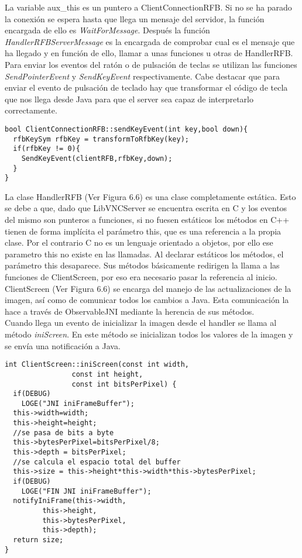 La variable aux\_this es un puntero a ClientConnectionRFB. Si no se ha parado la conexión se espera hasta que llega un mensaje del servidor, la función encargada de ello es \emph{WaitForMessage}. Después la función \emph{HandlerRFBServerMessage} es la encargada de comprobar cual es el mensaje que ha llegado y en función de ello, llamar a unas funciones u otras de HandlerRFB.\\

Para enviar los eventos del ratón o de pulsación de teclas se utilizan las funciones \emph{SendPointerEvent} y \emph{SendKeyEvent} respectivamente. Cabe destacar que para enviar el evento de pulsación de teclado hay que transformar el código de tecla que nos llega desde Java para que el server sea capaz de interpretarlo correctamente.
\begin{lstlisting}
bool ClientConnectionRFB::sendKeyEvent(int key,bool down){
  rfbKeySym rfbKey = transformToRfbKey(key);
  if(rfbKey != 0){
    SendKeyEvent(clientRFB,rfbKey,down);
  }
}
\end{lstlisting}

La clase HandlerRFB (Ver Figura 6.6) es una clase completamente estática. Esto se debe a que, dado que LibVNCServer se encuentra escrita en C y los eventos del mismo son punteros a funciones, si no fuesen estáticos los métodos en C++ tienen de forma implícita el parámetro this, que es una referencia a la propia clase. Por el contrario C no es un lenguaje orientado a objetos, por ello ese parametro this no existe en las llamadas. Al declarar estáticos los métodos, el parámetro this desaparece. Sus métodos básicamente redirigen la llama a las funciones de ClientScreen, por eso era necesario pasar la referencia al inicio.\\

ClientScreen (Ver Figura 6.6) se encarga del manejo de las actualizaciones de la imagen, así como de comunicar todos los cambios a Java. Esta comunicación la hace a través de ObservableJNI mediante la herencia de sus métodos.\\

Cuando llega un evento de inicializar la imagen desde el handler se llama al método \emph{iniScreen}. En este método se inicializan todos los valores de la imagen y se envía una notificación a Java.
\begin{lstlisting}
int ClientScreen::iniScreen(const int width,
			    const int height,
			    const int bitsPerPixel) {
  if(DEBUG)
    LOGE("JNI iniFrameBuffer");
  this->width=width;
  this->height=height;
  //se pasa de bits a byte
  this->bytesPerPixel=bitsPerPixel/8;
  this->depth = bitsPerPixel;
  //se calcula el espacio total del buffer
  this->size = this->height*this->width*this->bytesPerPixel;
  if(DEBUG)
    LOGE("FIN JNI iniFrameBuffer");
  notifyIniFrame(this->width,
		 this->height,
		 this->bytesPerPixel,
		 this->depth);
  return size;
}
\end{lstlisting}

